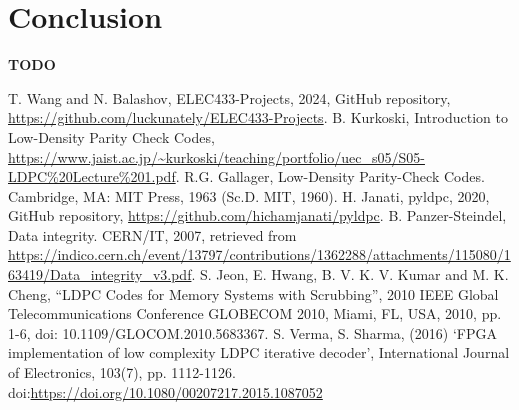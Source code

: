 \documentclass[conference]{IEEEtran}
\begin{document}

\section{Conclusion}
\textbf{TODO}

\begin{thebibliography}{00}
   T. Wang and N. Balashov, ELEC433-Projects, 2024, GitHub repository, \url{https://github.com/luckunately/ELEC433-Projects}.
   B. Kurkoski, Introduction to Low-Density Parity Check Codes, \url{https://www.jaist.ac.jp/~kurkoski/teaching/portfolio/uec_s05/S05-LDPC%20Lecture%201.pdf}.
   R.G. Gallager, Low-Density Parity-Check Codes. Cambridge, MA: MIT Press, 1963 (Sc.D. MIT, 1960).
   H. Janati, pyldpc, 2020, GitHub repository, \url{https://github.com/hichamjanati/pyldpc}.
   B. Panzer-Steindel, Data integrity. CERN/IT, 2007, retrieved from \url{https://indico.cern.ch/event/13797/contributions/1362288/attachments/115080/163419/Data_integrity_v3.pdf}.
  S. Jeon, E. Hwang, B. V. K. V. Kumar and M. K. Cheng, ``LDPC Codes for Memory Systems with Scrubbing'', 2010 IEEE Global Telecommunications Conference GLOBECOM 2010, Miami, FL, USA, 2010, pp. 1-6, doi: 10.1109/GLOCOM.2010.5683367.
   S. Verma, S. Sharma, (2016) `FPGA implementation of low complexity LDPC iterative decoder', International Journal of Electronics, 103(7), pp. 1112-1126. doi:\url{https://doi.org/10.1080/00207217.2015.1087052}
\end{thebibliography}
\end{document}
